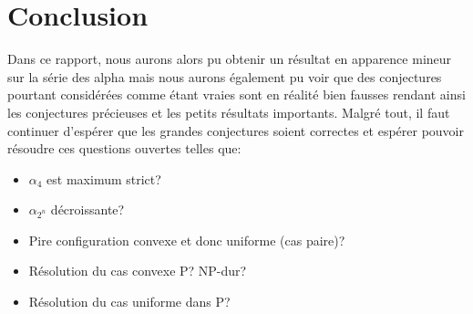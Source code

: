 \section{Conclusion}

Dans ce rapport, nous aurons alors pu obtenir un résultat en apparence mineur sur la série des alpha mais nous aurons également pu voir que des conjectures pourtant considérées comme étant vraies sont en réalité bien fausses rendant ainsi les conjectures précieuses et les petits résultats importants. Malgré tout, il faut continuer d'espérer que les grandes conjectures soient correctes et espérer pouvoir résoudre ces questions ouvertes telles que:

\begin{itemize}

\item $\alpha_4$ est maximum strict?
\item $\alpha_{2^n}$ décroissante?
\item Pire configuration convexe et donc uniforme (cas paire)?
\item Résolution du cas convexe P? NP-dur?
\item Résolution du cas uniforme dans P?

\end{itemize}
